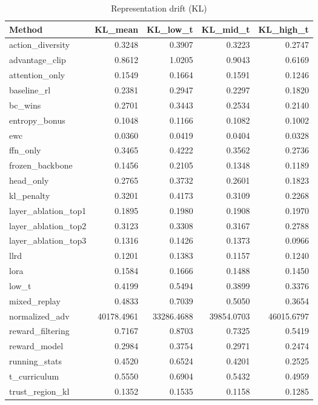 \begin{table}[htbp]
\centering
\caption{Representation drift (KL)}
\label{tab:repr-drift}
\begin{tabular}{lrrrr}
\toprule
\textbf{Method} & \textbf{KL\_mean} & \textbf{KL\_low\_t} & \textbf{KL\_mid\_t} & \textbf{KL\_high\_t} \\
\midrule
action\_diversity & 0.3248 & 0.3907 & 0.3223 & 0.2747 \\
advantage\_clip & 0.8612 & 1.0205 & 0.9043 & 0.6169 \\
attention\_only & 0.1549 & 0.1664 & 0.1591 & 0.1246 \\
baseline\_rl & 0.2381 & 0.2947 & 0.2297 & 0.1820 \\
bc\_wins & 0.2701 & 0.3443 & 0.2534 & 0.2140 \\
entropy\_bonus & 0.1048 & 0.1166 & 0.1082 & 0.1002 \\
ewc & 0.0360 & 0.0419 & 0.0404 & 0.0328 \\
ffn\_only & 0.3465 & 0.4222 & 0.3562 & 0.2736 \\
frozen\_backbone & 0.1456 & 0.2105 & 0.1348 & 0.1189 \\
head\_only & 0.2765 & 0.3732 & 0.2601 & 0.1823 \\
kl\_penalty & 0.3201 & 0.4173 & 0.3109 & 0.2268 \\
layer\_ablation\_top1 & 0.1895 & 0.1980 & 0.1908 & 0.1970 \\
layer\_ablation\_top2 & 0.3123 & 0.3308 & 0.3167 & 0.2788 \\
layer\_ablation\_top3 & 0.1316 & 0.1426 & 0.1373 & 0.0966 \\
llrd & 0.1201 & 0.1383 & 0.1157 & 0.1240 \\
lora & 0.1584 & 0.1666 & 0.1488 & 0.1450 \\
low\_t & 0.4199 & 0.5494 & 0.3899 & 0.3376 \\
mixed\_replay & 0.4833 & 0.7039 & 0.5050 & 0.3654 \\
normalized\_adv & 40178.4961 & 33286.4688 & 39854.0703 & 46015.6797 \\
reward\_filtering & 0.7167 & 0.8703 & 0.7325 & 0.5419 \\
reward\_model & 0.2984 & 0.3754 & 0.2971 & 0.2474 \\
running\_stats & 0.4520 & 0.6524 & 0.4201 & 0.2525 \\
t\_curriculum & 0.5550 & 0.6904 & 0.5432 & 0.4959 \\
trust\_region\_kl & 0.1352 & 0.1535 & 0.1158 & 0.1285 \\
\bottomrule
\end{tabular}
\end{table}